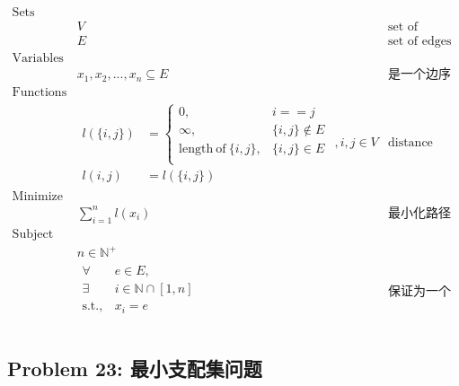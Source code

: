 \documentclass[11pt]{article}
\begin{document}
\begin{eqnarray*}
    \textrm{Sets} \\
        & V & \textrm{set of vertices} \\
        & E & \textrm{set of edges} \\
    \textrm{Variables} \\
        & x_1, x_2, ..., x_n \subseteq E & \textrm{是一个边序列} \\
    \textrm{Functions} \\
        & \begin{array}{rl}
            l(\{i, j\}) &= \left\{
                \begin{array}{ll}
                    0,                              & i == j \\
                    \infty,                         & \{i, j\} \notin E \\
                    \mathrm{length\ of\ }\{i, j\},  & \{i, j\} \in E \\
                \end{array}
            \right. \\
            l(i, j) &= l(\{i, j\})
        \end{array}, i, j \in V & \textrm{distance between vertices} \\
    \textrm{Minimize} \\
        & \displaystyle \sum_{i=1}^n l(x_i) & \textrm{最小化路径长度} \\
    \textrm{Subject to} \\
        & n \in \mathbb{N}^+ & \\
        & \begin{array}{rl}
            \forall & e \in E, \\
            \exists & i \in \mathbb{N} \cap [1, n] \\
            \mathrm{s.t.,} & x_i = e \\
        \end{array} & \textrm{保证为一个环} \\ 
\end{eqnarray*}


\newpage
\subsection*{Problem 23: 最小支配集问题}
\end{document}

